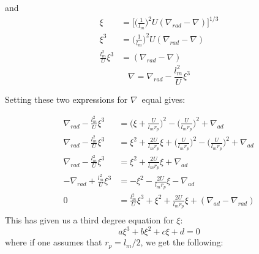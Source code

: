 \documentclass[a4paper,12pt]{article}
\begin{document}
and
\begin{equation*}
\begin{aligned}
 \xi &= \bigg[\bigg(\frac{1}{l_m}\bigg)^2 U(\nabla_{rad} - \nabla)\bigg]^{1/3}\\
\xi^3 &= \bigg(\frac{1}{l_m}\bigg)^2 U(\nabla_{rad} - \nabla)\\
\frac{l_m^2}{U} \xi^3 &= (\nabla_{rad} - \nabla)
\end{aligned}
\end{equation*}
\begin{equation}
 \nabla = \nabla_{rad} - \frac{l_m^2}{U} \xi^3
 \label{nabla}
\end{equation}

Setting these two expressions for $\nabla$ equal gives:

\begin{equation*}
\begin{aligned}
  \nabla_{rad} - \frac{l_m^2}{U} \xi^3 &=  \bigg(\xi + \frac{U}{l_m r_p}\bigg)^2 - \bigg(\frac{U}{l_m r_p}\bigg)^2 +  \nabla_{ad}\\
  \nabla_{rad} - \frac{l_m^2}{U} \xi^3 &=  \xi^2 + \frac{2U}{l_m r_p}\xi + \bigg(\frac{U}{l_m r_p}\bigg)^2 - \bigg(\frac{U}{l_m r_p}\bigg)^2 +  \nabla_{ad}\\
  \nabla_{rad} - \frac{l_m^2}{U} \xi^3 &=  \xi^2 + \frac{2U}{l_m r_p}\xi +  \nabla_{ad}\\
 -\nabla_{rad} + \frac{l_m^2}{U} \xi^3 &=  -\xi^2 - \frac{2U}{l_m r_p}\xi -  \nabla_{ad}\\
  0 &= \frac{l_m^2}{U} \xi^3 +\xi^2 +\frac{2U}{l_m r_p}\xi + (\nabla_{ad}- \nabla_{rad}) \\ 
\end{aligned}
\end{equation*}
This has given us a third degree equation for $\xi$:
\begin{equation}
 a\xi^3 + b\xi^2 + c\xi + d = 0
\end{equation}
where if one assumes that $r_p = l_m/2$, we get the following:
\end{document}
